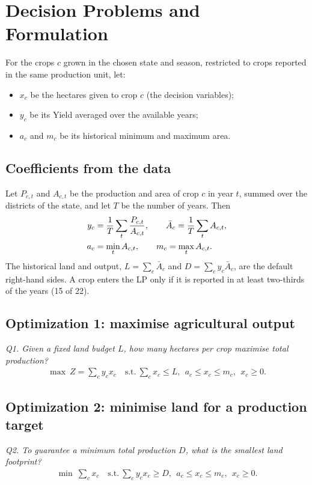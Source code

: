 \documentclass[conference]{IEEEtran}
\begin{document}
\section{Decision Problems and Formulation}
For the crops $c$ grown in the chosen state and season, restricted to crops reported in the
same production unit, let:
\begin{itemize}
  \item $x_c$ be the hectares given to crop $c$ (the decision variables);
  \item $y_c$ be its Yield averaged over the available years;
  \item $a_c$ and $m_c$ be its historical minimum and maximum area.
\end{itemize}

\subsection{Coefficients from the data}
Let $P_{c,t}$ and $A_{c,t}$ be the production and area of crop $c$ in year $t$, summed over
the districts of the state, and let $T$ be the number of years. Then
\begin{align}
y_c&=\frac{1}{T}\sum_t \frac{P_{c,t}}{A_{c,t}},\qquad
\bar A_c=\frac{1}{T}\sum_t A_{c,t}, \label{eq:coef}\\
a_c&=\min_t A_{c,t},\qquad m_c=\max_t A_{c,t}. \notag
\end{align}
The historical land and output, $L=\sum_c\bar A_c$ and $D=\sum_c y_c\bar A_c$, are the
default right-hand sides. A crop enters the LP only if it is reported in at least two-thirds
of the years (15 of 22).

\subsection{Optimization 1: maximise agricultural output}
\emph{Q1. Given a fixed land budget $L$, how many hectares per crop maximise total production?}
\begin{align}
\max\ Z=\textstyle\sum_c y_c x_c \quad
\text{s.t.}\ \textstyle\sum_c x_c\le L,\ \ a_c\le x_c\le m_c,\ \ x_c\ge0. \label{eq:o1}
\end{align}

\subsection{Optimization 2: minimise land for a production target}
\emph{Q2. To guarantee a minimum total production $D$, what is the smallest land footprint?}
\begin{align}
\min\ \textstyle\sum_c x_c \quad
\text{s.t.}\ \textstyle\sum_c y_c x_c\ge D,\ \ a_c\le x_c\le m_c,\ \ x_c\ge0. \label{eq:o2}
\end{align}
\end{document}
